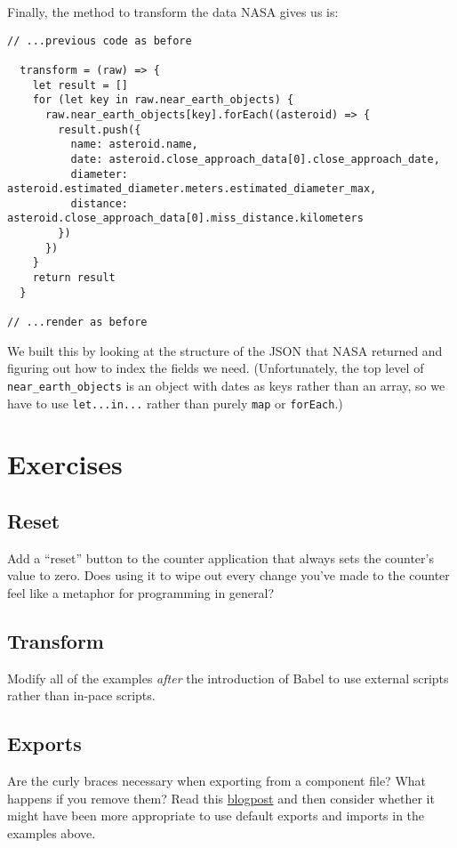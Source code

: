 Finally,
the method to transform the data NASA gives us is:

\begin{verbatim}
// ...previous code as before

  transform = (raw) => {
    let result = []
    for (let key in raw.near_earth_objects) {
      raw.near_earth_objects[key].forEach((asteroid) => {
        result.push({
          name: asteroid.name,
          date: asteroid.close_approach_data[0].close_approach_date,
          diameter: asteroid.estimated_diameter.meters.estimated_diameter_max,
          distance: asteroid.close_approach_data[0].miss_distance.kilometers
        })
      })
    }
    return result
  }

// ...render as before
\end{verbatim}

We built this by looking at the structure of the JSON that NASA returned
and figuring out how to index the fields we need.
(Unfortunately,
the top level of \texttt{near\_earth\_objects} is an object with dates as keys rather than an array,
so we have to use \texttt{let...in...} rather than purely \texttt{map} or \texttt{forEach}.)

\section{Exercises}\label{s:interactive-exercises}

\subsection*{Reset}
Add a ``reset'' button to the counter application that always sets the counter's value to zero.
Does using it to wipe out every change you've made to the counter
feel like a metaphor for programming in general?

\subsection*{Transform}
Modify all of the examples \emph{after} the introduction of Babel
to use external scripts rather than in-pace scripts.

\subsection*{Exports}
Are the curly braces necessary when exporting from a component file?
What happens if you remove them?
Read this \href{http://2ality.com/2014/09/es6-modules-final.html}{blogpost} and then consider whether it might
have been more appropriate to use default exports and imports
in the examples above.

